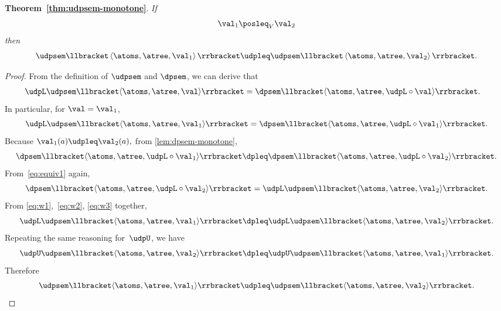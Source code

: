 \textbf{Theorem~\ref{thm:udpsem-monotone}}. \emph{If
    \[
        \val_{1}\posleq_{V}\val_{2}
    \]
    then
    \[
        \udpsem\llbracket\left\langle \atoms,\atree,\val_{1}\right\rangle \rrbracket\udpleq\udpsem\llbracket\left\langle \atoms,\atree,\val_{2}\right\rangle \rrbracket.
    \]
}
\begin{proof}
    From the definition of $\udpsem$ and $\dpsem$, we can derive that
    \begin{align}
        \udpL\udpsem\llbracket\langle\atoms,\atree,\val\rangle\rrbracket & =\dpsem\llbracket\langle\atoms,\atree,\udpL\circ\val\rangle\rrbracket.\label{eq:equiv1}
    \end{align}
    In particular, for $\val=\val_{1}$,
    \begin{equation}
        \udpL\udpsem\llbracket\langle\atoms,\atree,\val_{1}\rangle\rrbracket=\dpsem\llbracket\langle\atoms,\atree,\udpL\circ\val_{1}\rangle\rrbracket.\label{eq:w1}
    \end{equation}
    Because $\val_{1}(a)\udpleq\val_{2}(a),$ from \cref{lem:dpsem-monotone},
    \begin{equation}
        \dpsem\llbracket\langle\atoms,\atree,\udpL\circ\val_{1}\rangle\rrbracket\dpleq\dpsem\llbracket\langle\atoms,\atree,\udpL\circ\val_{2}\rangle\rrbracket.\label{eq:w2}
    \end{equation}
    From~\cref{eq:equiv1} again,
    \begin{equation}
        \dpsem\llbracket\langle\atoms,\atree,\udpL\circ\val_{2}\rangle\rrbracket=\udpL\udpsem\llbracket\langle\atoms,\atree,\val_{2}\rangle\rrbracket.\label{eq:w3}
    \end{equation}
    From \cref{eq:w1},~\cref{eq:w2}, \cref{eq:w3} together,
    \[
        \udpL\udpsem\llbracket\langle\atoms,\atree,\val_{1}\rangle\rrbracket\dpleq\udpL\udpsem\llbracket\langle\atoms,\atree,\val_{2}\rangle\rrbracket.
    \]
    Repeating the same reasoning for~$\udpU$, we have
    \[
        \udpU\udpsem\llbracket\langle\atoms,\atree,\val_{2}\rangle\rrbracket\dpleq\udpU\udpsem\llbracket\langle\atoms,\atree,\val_{1}\rangle\rrbracket.
    \]
    Therefore
    \[
        \udpsem\llbracket\langle\atoms,\atree,\val_{1}\rangle\rrbracket\udpleq\udpsem\llbracket\langle\atoms,\atree,\val_{2}\rangle\rrbracket.
    \]
\end{proof}

\vfill\pagebreak

